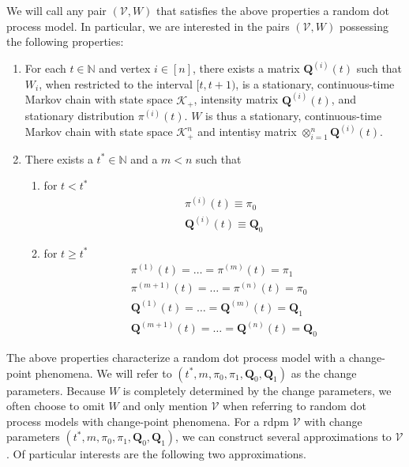 \documentclass[final]{IEEEtran}
\theoremstyle{definition}
\begin{document}
We will call any pair $(\mathscr{V}, W)$ that satisfies the above
properties a random dot process model.  In particular, we are
interested in the pairs $(\mathscr{V}, W)$ possessing the following
properties:
\begin{enumerate}
\item For each $t \in \mathbb{N}$ and vertex $i \in [n]$, there exists
  a matrix $\mathbf{Q}^{(i)}(t)$ such that $W_i$, when restricted to
  the interval $[t, t+1)$, is a stationary, continuous-time Markov
  chain with state space $\mathscr{K}_+$, intensity matrix
  ${\mathbf{Q}^{(i)}(t)}$, and stationary distribution
  $\pi^{(i)}(t)$. $W$ is thus a stationary, continuous-time Markov chain with state
  space $\mathscr{K}_{+}^{n}$ and intentisy matrix
  $\otimes_{i=1}^{n}\mathbf{Q}^{(i)}(t)$.
\item There exists a $t^{*} \in \mathbb{N}$ and a $m < n$ such that 
  \begin{enumerate}
  \item for  $t < t^{*}$
    \begin{gather*}
      \pi^{(i)}(t) \equiv \pi_0 \\
      \mathbf{Q}^{(i)}(t) \equiv \mathbf{Q}_0
    \end{gather*}
  \item  for $t \geq t^{*}$
    \begin{gather*}
      \pi^{(1)}(t) = \dots = \pi^{(m)}(t) = \pi_1 \\
      \pi^{(m+1)}(t)  = \dots = \pi^{(n)}(t) = \pi_0 \\
      \mathbf{Q}^{(1)}(t)  = \dots = \mathbf{Q}^{(m)}(t) = \mathbf{Q}_1 \\
      \mathbf{Q}^{(m+1)}(t) = \dots = \mathbf{Q}^{(n)}(t) = \mathbf{Q}_0 
    \end{gather*}
  \end{enumerate}
\end{enumerate}
The above properties characterize a random dot process model with a
change-point phenomena. We will refer to $(t^{*}, m, \pi_0, \pi_1,
\mathbf{Q}_0, \mathbf{Q}_1)$ as the change parameters. Because $W$ is completely
determined by the change parameters, we often choose to omit $W$ and
only mention $\mathscr{V}$ when referring to random dot process models
with change-point phenomena. For a rdpm $\mathscr{V}$ with change
parameters $(t^{*}, m, \pi_0, \pi_1, \mathbf{Q}_0, \mathbf{Q}_1)$, we can construct
several approximations to $\mathscr{V}$. Of particular interests are the
following two approximations.
\end{document}
